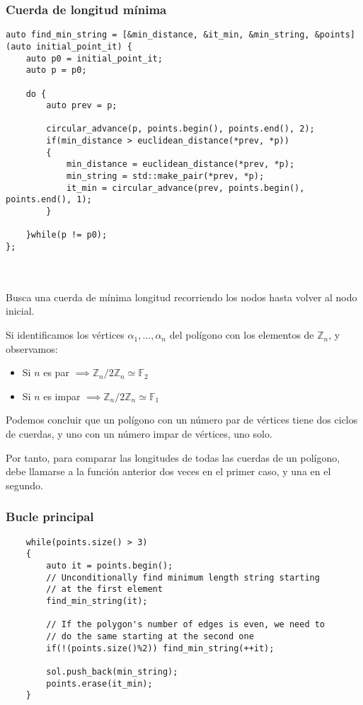\documentclass[compress]{beamer}
\begin{document}
\begin{frame}[fragile]
	\frametitle{Cuerda de longitud mínima}
        \begin{adjustbox}{width=10cm}
        
\begin{lstlisting}[basicstyle= \tiny,]
auto find_min_string = [&min_distance, &it_min, &min_string, &points](auto initial_point_it) {
    auto p0 = initial_point_it;
    auto p = p0;
    
    do {
        auto prev = p;
        
        circular_advance(p, points.begin(), points.end(), 2);
        if(min_distance > euclidean_distance(*prev, *p))
        {
            min_distance = euclidean_distance(*prev, *p);
            min_string = std::make_pair(*prev, *p);
            it_min = circular_advance(prev, points.begin(), points.end(), 1);
        }
      
    }while(p != p0);
};
\end{lstlisting}
\end{adjustbox}\hfill\\\hfill\\
	Busca una cuerda de mínima longitud recorriendo los nodos hasta volver al nodo inicial.
\end{frame}

\begin{frame}
Si identificamos los vértices $\alpha_1,\dots,\alpha_n$ del polígono con los elementos de $\mathbb{Z}_n$, y observamos:
\begin{itemize}
\item Si $n$ es par $\implies \mathbb{Z}_n/2\mathbb{Z}_n \simeq \mathbb{F}_2$
\item Si $n$ es impar $\implies \mathbb{Z}_n/2\mathbb{Z}_n \simeq \mathbb{F}_1$
\end{itemize}

Podemos concluir que un polígono con un número par de vértices tiene dos ciclos de cuerdas, y uno con un número impar de vértices, uno solo.

Por tanto, para comparar las longitudes de todas las cuerdas de un polígono, debe llamarse a la función anterior dos veces en el primer caso, y una en el segundo.
\end{frame}

\begin{frame}[fragile]
	\frametitle{Bucle principal}
	\begin{lstlisting}
	while(points.size() > 3)
	{
		auto it = points.begin();
		// Unconditionally find minimum length string starting
		// at the first element
		find_min_string(it);
	
		// If the polygon's number of edges is even, we need to
		// do the same starting at the second one
		if(!(points.size()%2)) find_min_string(++it);
	
		sol.push_back(min_string);
		points.erase(it_min);
	}
	\end{lstlisting}
	
\end{frame}
\end{document}
